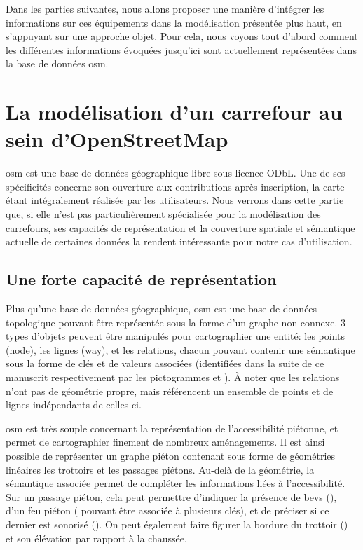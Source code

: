 Dans les parties suivantes, nous allons proposer une manière d'intégrer les informations sur ces équipements dans la modélisation présentée plus haut, en s'appuyant sur une approche objet. Pour cela, nous voyons tout d'abord comment les différentes informations évoquées jusqu'ici sont actuellement représentées dans la base de données \gls{osm}.

\section{La modélisation d’un carrefour au sein d’OpenStreetMap}

\label{sec:modelisation_osm}


\gls{osm} est une base de données géographique libre sous licence ODbL. Une de ses spécificités concerne son ouverture aux contributions après inscription, la carte étant intégralement réalisée par les utilisateurs. Nous verrons dans cette partie que, si elle n'est pas particulièrement spécialisée pour la modélisation des carrefours, ses capacités de représentation et la couverture spatiale et sémantique actuelle de certaines données la rendent intéressante pour notre cas d'utilisation.

\subsection{Une forte capacité de représentation}

Plus qu'une base de données géographique, \gls{osm} est une base de données topologique pouvant être représentée sous la forme d'un graphe non connexe. 3 types d'objets peuvent être manipulés pour cartographier une entité: les points (node), les lignes (way), et les relations, chacun pouvant contenir une sémantique sous la forme de clés et de valeurs associées (identifiées dans la suite de ce manuscrit respectivement par les pictogrammes \faKey \space et \faFileTextO). À noter que les relations n'ont pas de géométrie propre, mais référencent un ensemble de points et de lignes indépendants de celles-ci.

\newpar{}


\gls{osm} est très souple concernant la représentation de l'accessibilité piétonne, et permet de cartographier finement de nombreux aménagements. Il est ainsi possible de représenter un graphe piéton contenant sous forme de géométries linéaires les trottoirs et les passages piétons. Au-delà de la géométrie, la sémantique associée permet de compléter les informations liées à l'accessibilité. Sur un passage piéton, cela peut permettre d'indiquer la présence de \glspl{bev} (), d'un feu piéton ( pouvant être associée à plusieurs clés), et de préciser si ce dernier est sonorisé (). On peut également faire figurer la bordure du trottoir () et son élévation par rapport à la chaussée.


